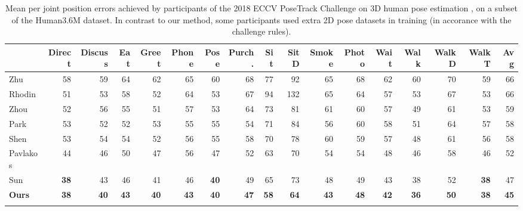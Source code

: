 \documentclass[10pt,twocolumn,letterpaper]{article}
\begin{document}
\setlength\tabcolsep{1.9mm}
\begin{table*}[t]
\footnotesize
\centering
\begin{tabular}{lrrrrrrrrrrrrrrr|r}
\hline
                                  & Direct & Discuss    & Eat & Greet & Phone & Pose  & Purch. & Sit   & SitD  & Smoke & Photo & Wait  & Walk & WalkD &WalkT & Avg \\
\hline
Zhu      & 58 & 59 & 64 & 62 & 65 & 60 & 68 & 77 & 92  & 65  & 68  & 62  & 60  & 70  & 59  & 66  \\
Rhodin   & 51 & 53 & 58 & 52 & 64 & 53 & 67 & 94 & 132 & 65  & 64  & 57  & 53  & 67  & 53  & 66  \\
Zhou     & 52 & 56 & 55 & 51 & 57 & 53 & 64 & 73 & 81  & 61  & 60  & 57  & 49  & 61  & 53  & 59  \\
Park     & 53 & 52 & 52 & 53 & 55 & 55 & 54 & 71 & 84  & 56  & 60  & 58  & 51  & 64  & 57  & 58  \\
Shen     & 53 & 54 & 54 & 52 & 56 & 55 & 58 & 70 & 78  & 60  & 59  & 57  & 48  & 61  & 56  & 58  \\
Pavlakos & 44 & 46 & 50 & 47 & 56 & 47 & 52 & 63 & 70  & 54  & 54  & 48  & 46  & 58  & 46  & 52  \\
Sun      & \textbf{38} & 43 & 46 & 41 & 46  & \textbf{40} & 49 & 65 & 73  & 48 & 49  & 43  & 38  & 52  & \textbf{38}  & 47  \\
\hline
\textbf{Ours}     & \textbf{38} & \textbf{40} & \textbf{43} & \textbf{40} & \textbf{43} & \textbf{40} & \textbf{47} & \textbf{58} & \textbf{64}  & \textbf{43}  &  \textbf{48} & \textbf{42}  & \textbf{36}  & \textbf{50}  & \textbf{38}  & \textbf{45}  \\
\hline \\
\end{tabular}
\caption{Mean per joint position errors achieved by participants of the 2018 ECCV PoseTrack Challenge on 3D human pose estimation \cite{PoseTrackChallengeRankingsECCVW18}, on a subset of the Human3.6M dataset. In contrast to our method, some participants used extra 2D pose datasets in training (in accorance with the challenge rules).}
\label{tab:challenge_results}
\end{table*}
\end{document}
